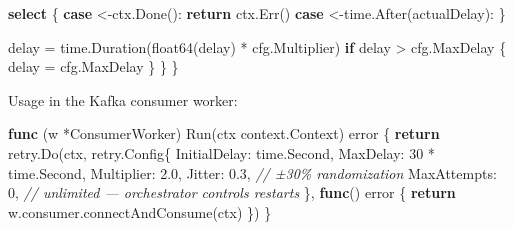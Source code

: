 \documentclass[
]{article}
\newenvironment{Shaded}{}{}
\newcommand{\CommentTok}[1]{\textcolor[rgb]{0.38,0.63,0.69}{\textit{#1}}}
\newcommand{\ControlFlowTok}[1]{\textcolor[rgb]{0.00,0.44,0.13}{\textbf{#1}}}
\newcommand{\DataTypeTok}[1]{\textcolor[rgb]{0.56,0.13,0.00}{#1}}
\newcommand{\DecValTok}[1]{\textcolor[rgb]{0.25,0.63,0.44}{#1}}
\newcommand{\FloatTok}[1]{\textcolor[rgb]{0.25,0.63,0.44}{#1}}
\newcommand{\KeywordTok}[1]{\textcolor[rgb]{0.00,0.44,0.13}{\textbf{#1}}}
\newcommand{\NormalTok}[1]{#1}
\newcommand{\OperatorTok}[1]{\textcolor[rgb]{0.40,0.40,0.40}{#1}}
\begin{document}
\begin{Shaded}
\begin{Highlighting}[]
        \ControlFlowTok{select} \OperatorTok{\{}
        \ControlFlowTok{case} \OperatorTok{\textless{}{-}}\NormalTok{ctx}\OperatorTok{.}\NormalTok{Done}\OperatorTok{():}
            \ControlFlowTok{return}\NormalTok{ ctx}\OperatorTok{.}\NormalTok{Err}\OperatorTok{()}
        \ControlFlowTok{case} \OperatorTok{\textless{}{-}}\NormalTok{time}\OperatorTok{.}\NormalTok{After}\OperatorTok{(}\NormalTok{actualDelay}\OperatorTok{):}
        \OperatorTok{\}}

\NormalTok{        delay }\OperatorTok{=}\NormalTok{ time}\OperatorTok{.}\NormalTok{Duration}\OperatorTok{(}\DataTypeTok{float64}\OperatorTok{(}\NormalTok{delay}\OperatorTok{)} \OperatorTok{*}\NormalTok{ cfg}\OperatorTok{.}\NormalTok{Multiplier}\OperatorTok{)}
        \ControlFlowTok{if}\NormalTok{ delay }\OperatorTok{\textgreater{}}\NormalTok{ cfg}\OperatorTok{.}\NormalTok{MaxDelay }\OperatorTok{\{}
\NormalTok{            delay }\OperatorTok{=}\NormalTok{ cfg}\OperatorTok{.}\NormalTok{MaxDelay}
        \OperatorTok{\}}
    \OperatorTok{\}}
\OperatorTok{\}}
\end{Highlighting}
\end{Shaded}

Usage in the Kafka consumer worker:

\begin{Shaded}
\begin{Highlighting}[]
\KeywordTok{func} \OperatorTok{(}\NormalTok{w }\OperatorTok{*}\NormalTok{ConsumerWorker}\OperatorTok{)}\NormalTok{ Run}\OperatorTok{(}\NormalTok{ctx context}\OperatorTok{.}\NormalTok{Context}\OperatorTok{)} \DataTypeTok{error} \OperatorTok{\{}
    \ControlFlowTok{return}\NormalTok{ retry}\OperatorTok{.}\NormalTok{Do}\OperatorTok{(}\NormalTok{ctx}\OperatorTok{,}\NormalTok{ retry}\OperatorTok{.}\NormalTok{Config}\OperatorTok{\{}
\NormalTok{        InitialDelay}\OperatorTok{:}\NormalTok{ time}\OperatorTok{.}\NormalTok{Second}\OperatorTok{,}
\NormalTok{        MaxDelay}\OperatorTok{:}     \DecValTok{30} \OperatorTok{*}\NormalTok{ time}\OperatorTok{.}\NormalTok{Second}\OperatorTok{,}
\NormalTok{        Multiplier}\OperatorTok{:}   \DecValTok{2}\FloatTok{.0}\OperatorTok{,}
\NormalTok{        Jitter}\OperatorTok{:}       \DecValTok{0}\FloatTok{.3}\OperatorTok{,} \CommentTok{// ±30\% randomization}
\NormalTok{        MaxAttempts}\OperatorTok{:}  \DecValTok{0}\OperatorTok{,}   \CommentTok{// unlimited — orchestrator controls restarts}
    \OperatorTok{\},} \KeywordTok{func}\OperatorTok{()} \DataTypeTok{error} \OperatorTok{\{}
        \ControlFlowTok{return}\NormalTok{ w}\OperatorTok{.}\NormalTok{consumer}\OperatorTok{.}\NormalTok{connectAndConsume}\OperatorTok{(}\NormalTok{ctx}\OperatorTok{)}
    \OperatorTok{\})}
\OperatorTok{\}}
\end{Highlighting}
\end{Shaded}
\end{document}
